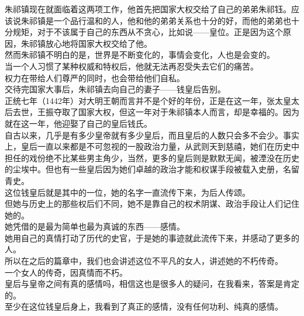 \begin{multicols}{\theparacolNo}
朱祁镇现在就面临着这两项工作，他首先把国家大权交给了自己的弟弟朱祁钰。应该说朱祁镇是一个品行温和的人，他和他的弟弟关系也十分的好，而他的弟弟也十分规矩，对于不该属于自己的东西从不贪心，比如说——皇位。正是因为这个原因，朱祁镇放心地将国家大权交给了他。\\

然而朱祁镇不明白的是，世界是不断变化的，事情会变化，人也是会变的。\\

当一个人习惯了某种权威和特权后，他就无法再忍受失去它们的痛苦。\\

权力在带给人们尊严的同时，也会带给他们自私。\\

交待完国家大事后，朱祁镇去向自己的妻子——钱皇后告别。\\

正统七年（1442年）对大明王朝而言并不是个好的年份，正是在这一年，张太皇太后去世，王振夺取了国家大权，但这一年对于朱祁镇本人而言，却是幸福的。因为就在这一年，他迎娶了自己的皇后钱氏。\\

自古以来，几乎是有多少皇帝就有多少皇后，而且皇后的人数只会多不会少。事实上，皇后一直以来都是不可忽视的一股政治力量，从武则天到慈禧，她们在历史中担任的戏份绝不比某些男主角少，当然，更多的皇后则是默默无闻，被湮没在历史的尘埃中。但也有一些皇后因为她们卓越的政治才能和权谋手段被载入史册，名留青史。\\

这位钱皇后就是其中的一位，她的名字一直流传下来，为后人传颂。\\

但她与历史上的那些权后们不同，她不是靠自己的权术阴谋、政治手段让人们记住她的。\\

她凭借的是最为简单也最为真诚的东西——感情。\\

她用自己的真情打动了历代的史官，于是她的事迹就此流传下来，并感动了更多的人。\\

所以在之后的篇章中，我们也会讲述这位不平凡的女人，讲述她的不朽传奇。\\

一个女人的传奇，因真情而不朽。\\

皇后与皇帝之间有真的感情吗，相信这也是很多人的疑问，在我看来，答案是肯定的。\\

至少在这位钱皇后身上，我看到了真正的感情，没有任何功利、纯真的感情。\\


\end{multicols}
